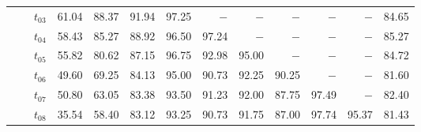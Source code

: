 \begin{table}[ht]
\begin{tabular}{@{}l l l *{10}{r}@{}}
 & & $t_{03}$ & 61.04 & 88.37 & 91.94 & 97.25 & $-$ & $-$ & $-$ & $-$ & $-$ & 84.65 \\
 & & $t_{04}$ & 58.43 & 85.27 & 88.92 & 96.50 & 97.24 & $-$ & $-$ & $-$ & $-$ & 85.27 \\
 & & $t_{05}$ & 55.82 & 80.62 & 87.15 & 96.75 & 92.98 & 95.00 & $-$ & $-$ & $-$ & 84.72 \\
 & & $t_{06}$ & 49.60 & 69.25 & 84.13 & 95.00 & 90.73 & 92.25 & 90.25 & $-$ & $-$ & 81.60 \\
 & & $t_{07}$ & 50.80 & 63.05 & 83.38 & 93.50 & 91.23 & 92.00 & 87.75 & 97.49 & $-$ & 82.40 \\
 & & $t_{08}$ & 35.54 & 58.40 & 83.12 & 93.25 & 90.73 & 91.75 & 87.00 & 97.74 & 95.37 & 81.43 \\
\bottomrule
\end{tabular}
\end{table}

